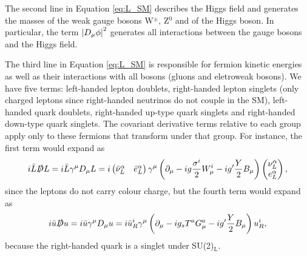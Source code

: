 The second line in Equation \eqref{eq:L_SM} describes the Higgs field and generates the masses of the weak gauge bosons W$^{\pm}$, Z$^{0}$ and of the Higgs boson. In particular, the term $\left\lvert D_{\mu}\phi\right\rvert^2$ generates all interactions between the gauge bosons and the Higgs field.

The third line in Equation \eqref{eq:L_SM} is responsible for fermion kinetic energies as well as their interactions with all bosons (gluons and eletroweak bosons). We have five terms: left-handed lepton doublets, right-handed lepton singlets (only charged leptons since right-handed neutrinos do not couple in the SM), left-handed quark doublets, right-handed up-type quark singlets and right-handed down-type quark singlets. The covariant derivative terms relative to each group apply only to these fermions that transform under that group. For instance, the first term would expand as
\begin{equation*}
    i\bar{L}\slashed{D} L = i\bar{L}\gamma^{\mu}D_\mu L = i
    \begin{pmatrix}
        \bar{\nu}_{L}^{\alpha} & \bar{e}_{L}^{\alpha}
    \end{pmatrix}
    \gamma^{\mu}\left(\partial_\mu - ig\frac{\sigma^{i}}{2}W_\mu^{i} - ig'\frac{Y}{2}B_\mu\right)
    \begin{pmatrix}
        \nu_{L}^{\alpha}\\
        e_{L}^{\alpha}
    \end{pmatrix},
\end{equation*}
since the leptons do not carry colour charge, but the fourth term would expand as
\begin{equation*}
    i\bar{u}\slashed{D} u = i\bar{u}\gamma^{\mu}D_\mu u = i \bar{u}_{R}^{i}
    \gamma^{\mu}\left(\partial_\mu - ig_{s}T^{a}G_\mu^{a} - ig'\frac{Y}{2}B_\mu\right) u_{R}^{i},
\end{equation*}
because the right-handed quark is a singlet under SU(2)$_{\text{L}}$.

